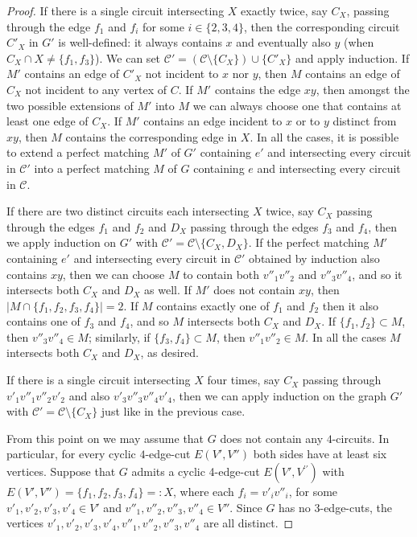 \documentclass[]{theclass}
\begin{document}
\begin{proof}
If there is a single circuit intersecting $X$ exactly twice, say $C_X$, passing through the edge $f_1$ and $f_i$ for some $i\in\{2,3,4\}$, then the corresponding circuit $C'_X$ in $G'$ is well-defined: it always contains $x$ and eventually also $y$ (when $C_X\cap X\neq\{f_1,f_3\}$). We can set $\mathcal{C}'=(\mathcal{C}\setminus \{C_X\})\cup \{C'_X\}$ and apply induction. If $M'$ contains an edge of $C'_X$ not incident to $x$ nor $y$, then $M$ contains an edge of $C_X$ not incident to any vertex of $C$. If $M'$ contains the edge $xy$, then  amongst the two possible extensions of $M'$ into $M$ we can always choose one that contains at least one edge of $C_X$. If $M'$ contains an edge incident to $x$ or to $y$ distinct from $xy$, then $M$ contains the corresponding edge in $X$. In all the cases, it is possible to extend a perfect matching $M'$ of $G'$ containing $e'$ and intersecting every circuit in $\mathcal{C}'$ into a perfect matching $M$ of $G$ containing $e$ and intersecting every circuit in $\mathcal{C}$. 

If there are two distinct circuits each intersecting $X$ twice, say $C_X$ passing through the edges $f_1$ and $f_2$ and $D_X$ passing through the edges $f_3$ and $f_4$, then we apply induction on $G'$ with $\mathcal{C}'=\mathcal{C}\setminus \{C_X,D_X\}$. If the perfect matching $M'$ containing $e'$ and intersecting every circuit in $\mathcal{C}'$ obtained by induction also contains $xy$, then we can choose $M$ to contain both $v''_1v''_2$ and $v''_3v''_4$, and so it intersects both $C_X$ and $D_X$ as well. If $M'$ does not contain $xy$, then $|M\cap \{f_1,f_2,f_3,f_4\}|=2$. If $M$ contains exactly one of $f_1$ and $f_2$ then it also contains one of $f_3$ and $f_4$, and so $M$ intersects both $C_X$ and $D_X$. If $\{f_1,f_2\}\subset M$, then $v''_3v''_4\in M$; similarly, if $\{f_3,f_4\}\subset M$, then $v''_1v''_2\in M$. In all the cases $M$ intersects both $C_X$ and $D_X$, as desired.

If there is a single circuit intersecting $X$ four times, say $C_X$ passing through $v'_1v''_1v''_2v'_2$ and also $v'_3v''_3v''_4v'_4$, then we can apply induction on the graph $G'$ with $\mathcal{C}'=\mathcal{C}\setminus \{C_X\}$ just like in the previous case.



\medskip 
From this point on we may assume that $G$ does not contain any $4$-circuits. In particular, for every cyclic $4$-edge-cut $E(V',V'')$ both sides have at least six vertices.
Suppose that $G$ admits a cyclic 4-edge-cut $E(V',V^{\prime\prime})$ with $E(V',V'')=\{f_{1}, f_{2}, f_{3}, f_{4}\} =:X$, where each $f_{i}=v'_{i}v''_{i}$, for some $v'_{1},v'_{2},v'_{3},v'_{4}\in V'$ and $ v''_{1},v''_{2}, v''_{3}, v''_{4}\in V''$. Since $G$ has no 3-edge-cuts, the vertices $v'_{1},v'_{2},v'_{3},v'_{4},  v''_{1},v''_{2}, v''_{3},v''_{4}$ are all  distinct.


\end{proof}
\end{document}
